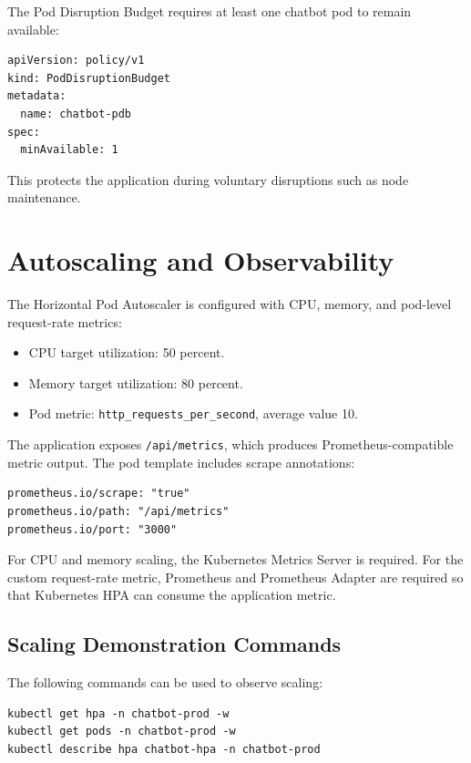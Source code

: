 \documentclass[12pt,a4paper]{article}
\begin{document}
The Pod Disruption Budget requires at least one chatbot pod to remain available:

\begin{lstlisting}[style=projectcode]
apiVersion: policy/v1
kind: PodDisruptionBudget
metadata:
  name: chatbot-pdb
spec:
  minAvailable: 1
\end{lstlisting}

This protects the application during voluntary disruptions such as node
maintenance.

\section{Autoscaling and Observability}

The Horizontal Pod Autoscaler is configured with CPU, memory, and pod-level
request-rate metrics:

\begin{itemize}[leftmargin=*]
    \item CPU target utilization: 50 percent.
    \item Memory target utilization: 80 percent.
    \item Pod metric: \texttt{http\_requests\_per\_second}, average value 10.
\end{itemize}

The application exposes \texttt{/api/metrics}, which produces
Prometheus-compatible metric output. The pod template includes scrape
annotations:

\begin{lstlisting}[style=projectcode]
prometheus.io/scrape: "true"
prometheus.io/path: "/api/metrics"
prometheus.io/port: "3000"
\end{lstlisting}

For CPU and memory scaling, the Kubernetes Metrics Server is required. For the
custom request-rate metric, Prometheus and Prometheus Adapter are required so
that Kubernetes HPA can consume the application metric.

\subsection{Scaling Demonstration Commands}

The following commands can be used to observe scaling:

\begin{lstlisting}[style=projectcode]
kubectl get hpa -n chatbot-prod -w
kubectl get pods -n chatbot-prod -w
kubectl describe hpa chatbot-hpa -n chatbot-prod
\end{lstlisting}
\end{document}
